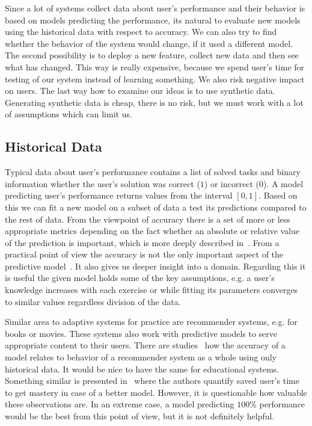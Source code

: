 \documentclass[table,color,cover,twoside,nolot,nolof]{fithesis3/fithesis3}
\begin{document}
Since a lot of systems collect data about user's performance and their
behavior is based on models predicting the performance, its natural to
evaluate new models using the historical data with respect to accuracy. We can
also try to find whether the behavior of the system would change, if it used a
different model. The second possibility is to deploy a new feature, collect new
data and then see what has changed. This way is really expensive, because we
spend user's time for testing of our system instead of learning something. We
also risk negative impact on users. The last way how to examine our ideas is to
use synthetic data. Generating synthetic data is cheap, there is no risk, but
we must work with a lot of assumptions which can limit us.

\subsection{Historical Data}

Typical data about user's performance contains a list of solved tasks and
binary information whether the user's solution was correct ($1$) or incorrect
($0$). A model predicting user's performance returns values from the interval
$[0, 1]$. Based on this we can fit a new model on a subset of data a test its
predictions compared to the rest of data. From the viewpoint of accuracy there
is a set of more or less appropriate metrics depending on the fact whether an
absolute or relative value of the prediction is important, which is more deeply
described in~\cite{pelanek2014brief}.  From a practical point of view the
accuracy is not the only important aspect of the predictive
model~\cite{huang2015framework}. It also gives us deeper insight into a domain.
Regarding this it is useful the given model holds some of the key assumptions,
e.g. a user's knowledge increases with each exercise or while fitting its
parameters converges to similar values regardless division of the data.

Similar area to adaptive systems for practice are recommender systems, e.g. for
books or movies. These systems also work with predictive models to serve
appropriate content to their users. There are
studies~\cite{cremonesi2010performance} how the accuracy of a model relates to
behavior of a recommender system as a whole using only historical data. It
would be nice to have the same for educational systems. Something similar is
presented in~\cite{yudelson2015small} where the authors quantify saved user's
time to get mastery in case of a better model. However, it is questionable how
valuable these observations are. In an extreme case, a model predicting $100\%$
performance would be the best from this point of view, but it is not definitely
helpful.
\end{document}
